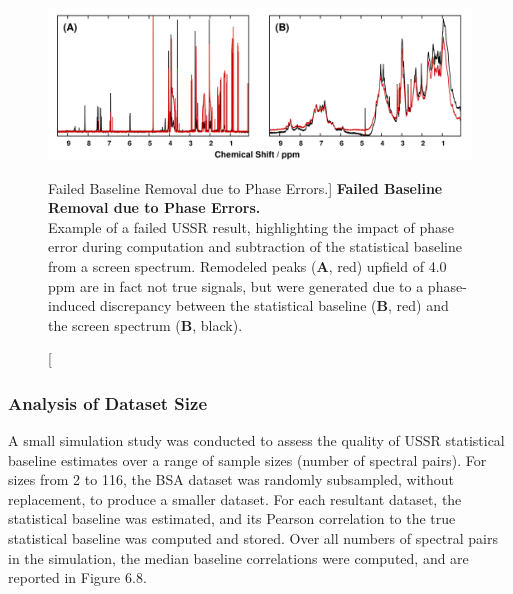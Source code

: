\begin{figure}[ht!]
\includegraphics[width=6.5in]{figs/pscorr/07-ussrfail.png}
\caption
      [Failed Baseline Removal due to Phase Errors.]{
  {\bf Failed Baseline Removal due to Phase Errors.}
  \\
  Example of a failed USSR result, highlighting the impact of phase error
  during computation and subtraction of the statistical baseline from a screen
  spectrum. Remodeled peaks ({\bf A}, red) upfield of 4.0 ppm are in fact not
  true signals, but were generated due to a phase-induced discrepancy between
  the statistical baseline ({\bf B}, red) and the screen spectrum
  ({\bf B}, black).
}
\end{figure}

\subsubsection{Analysis of Dataset Size}

\begin{doublespace}
A small simulation study was conducted to assess the quality of USSR
statistical baseline estimates over a range of sample sizes (number of spectral
pairs). For sizes from 2 to 116, the BSA dataset was randomly subsampled,
without replacement, to produce a smaller dataset. For each resultant dataset,
the statistical baseline was estimated, and its Pearson correlation to the true
statistical baseline was computed and stored. Over all numbers of spectral
pairs in the simulation, the median baseline correlations were computed, and
are reported in Figure 6.8.
\end{doublespace}

